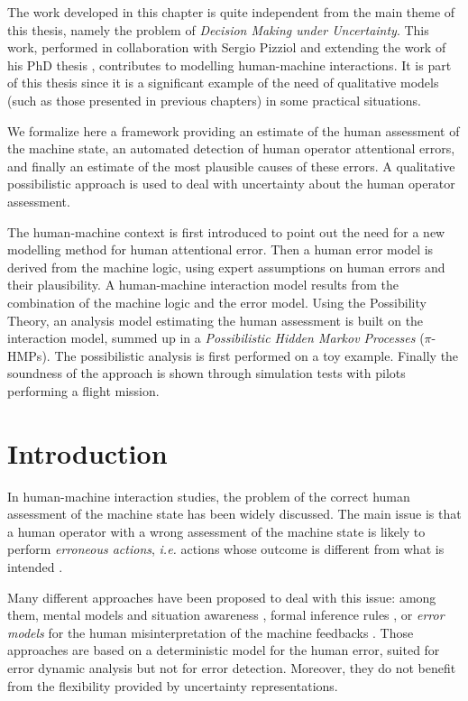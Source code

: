 The work developed in this chapter is quite independent 
from the main theme of this thesis, namely the problem of
\textit{Decision Making under Uncertainty}.
This work, performed in collaboration with Sergio Pizziol
and extending the work of his PhD thesis \cite{SERGIOTHESIS}, 
contributes to modelling human-machine interactions.
It is part of this thesis since it is a significant example of 
the need of qualitative models (such as those presented in previous chapters)
in some practical situations.

We formalize here a framework providing an estimate 
of the human assessment of the machine state, 
an automated detection of human operator attentional errors, 
and finally an estimate of the most plausible causes of these errors.
A qualitative possibilistic approach is used to deal 
with uncertainty about the human operator assessment. 

The human-machine context is first introduced to point out the need 
for a new modelling method for human attentional error.
Then a human error model is derived from the machine logic, using expert assumptions on human errors and their plausibility.
A human-machine interaction model results from the combination of the machine logic and the error model.
Using the Possibility Theory, an analysis model estimating the human assessment 
is built on the interaction model, summed up in a \textit{Possibilistic Hidden Markov Processes} ($\pi$-HMPs).
The possibilistic analysis is first performed on a toy example. 
Finally the soundness of the approach is shown through simulation tests 
with pilots performing a flight mission.


\section{Introduction}
\label{intro}
In human-machine interaction studies, the problem of the 
correct human assessment of the machine state has been widely discussed. 
The main issue is that a human operator with a wrong assessment of the 
machine state is likely to perform {\em erroneous actions}, \textit{i.e.} 
actions whose outcome is different from what is intended \cite{Joshi03}. 

Many different approaches have been proposed to deal with this issue: 
among them, mental models and situation awareness \cite{Endsley95,rushby99}, 
formal inference rules \cite{Obrien09}, or {\em error models} for the human 
misinterpretation of the machine feedbacks \cite{rushby02a}. Those approaches 
are based on a deterministic model for the human error, suited for error 
dynamic analysis but not for error detection. Moreover, they do not benefit 
from the flexibility provided by uncertainty representations.

